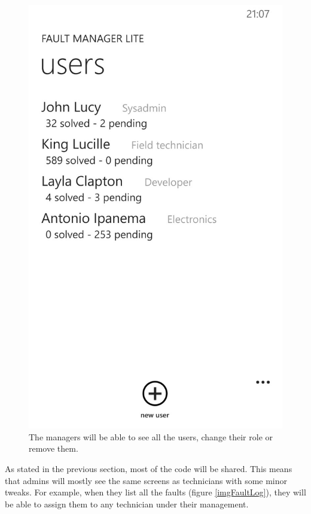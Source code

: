 \documentclass{report}
\begin{document}
\begin{figure}[hbtp]
\begin{minipage}{0.3\textwidth}
\includegraphics[width=\textwidth]{img/Users.jpg}
\end{minipage}
\caption{The managers will be able to see all the users, change their role or remove them.}
\label{imgUsers}
\end{figure}


As stated in the previous section, most of the code will be shared. This means that admins will mostly see the same screens as technicians with some minor tweaks. For example, when they list all the faults (figure \ref{imgFaultLog}), they will be able to assign them to any technician under their management.
\end{document}
